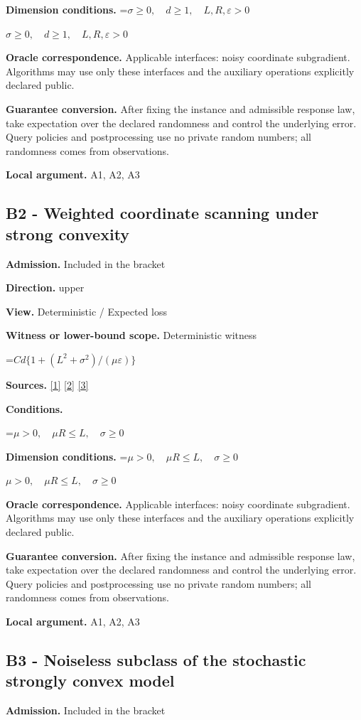 \documentclass[10pt,a4paper]{article}
\newcommand{\AtlasMath}[1]{\par\begingroup\centering\setbox0=\hbox{$\displaystyle #1$}\ifdim\wd0>1.4\linewidth\typeout{ATLAS WIDE FORMULA: \the\wd0}\fi\ifdim\wd0>\linewidth\resizebox{\linewidth}{!}{\box0}\else\box0\fi\par\endgroup}
\newcommand{\AtlasInlineMath}[1]{\begingroup\setbox0=\hbox{$#1$}\ifdim\wd0>.4\linewidth\endgroup\AtlasMath{#1}\else\endgroup$#1$\fi}
\begin{document}
\textbf{Dimension conditions.} \AtlasInlineMath{\sigma\ge0,\quad d\ge1,\quad L,R,\varepsilon>0}

\textbf{Oracle correspondence.} Applicable interfaces: noisy coordinate subgradient. Algorithms may use only these interfaces and the auxiliary operations explicitly declared public.

\textbf{Guarantee conversion.} After fixing the instance and admissible response law, take expectation over the declared randomness and control the underlying error. Query policies and postprocessing use no private random numbers; all randomness comes from observations.

\textbf{Local argument.} A1, A2, A3

\subsection{B2 - Weighted coordinate scanning under strong convexity}
\textbf{Admission.} Included in the bracket

\textbf{Direction.} upper

\textbf{View.} Deterministic / Expected loss

\textbf{Witness or lower-bound scope.} Deterministic witness

\AtlasMath{Cd\{1+(L^2+\sigma^2)/(\mu\varepsilon)\}}
\textbf{Sources.} \href{https://arxiv.org/pdf/1405.4980}{[1]} \href{https://www2.isye.gatech.edu/~nemirovs/MOR_AccuracyCertificates.pdf}{[2]} \href{https://arxiv.org/pdf/2609.20701}{[3]}

\textbf{Conditions.} 
\AtlasMath{\mu>0,\quad\mu R\le L,\quad\sigma\ge0}


\textbf{Dimension conditions.} \AtlasInlineMath{\mu>0,\quad\mu R\le L,\quad\sigma\ge0}

\textbf{Oracle correspondence.} Applicable interfaces: noisy coordinate subgradient. Algorithms may use only these interfaces and the auxiliary operations explicitly declared public.

\textbf{Guarantee conversion.} After fixing the instance and admissible response law, take expectation over the declared randomness and control the underlying error. Query policies and postprocessing use no private random numbers; all randomness comes from observations.

\textbf{Local argument.} A1, A2, A3

\subsection{B3 - Noiseless subclass of the stochastic strongly convex model}
\textbf{Admission.} Included in the bracket
\end{document}
